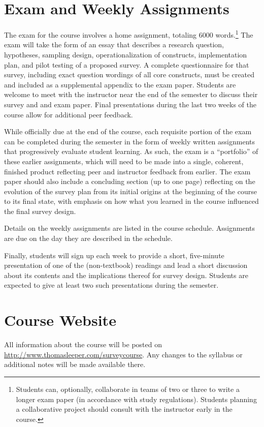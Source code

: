 \documentclass[11pt,a4paper]{article}
\begin{document}
\section{Exam and Weekly Assignments}
The exam for the course involves a home assignment, totaling 6000 words.\footnote{Students can, optionally, collaborate in teams of two or three to write a longer exam paper (in accordance with study regulations). Students planning a collaborative project should consult with the instructor early in the course.} The exam will take the form of an essay that describes a research question, hypotheses, sampling design, operationalization of constructs, implementation plan, and pilot testing of a proposed survey. A complete questionnaire for that survey, including exact question wordings of all core constructs, must be created and included as a supplemental appendix to the exam paper. Students are welcome to meet with the instructor near the end of the semester to discuss their survey and and exam paper. Final presentations during the last two weeks of the course allow for additional peer feedback.

While officially due at the end of the course, each requisite portion of the exam can be completed during the semester in the form of weekly written assignments that progressively evaluate student learning. As such, the exam is a ``portfolio'' of these earlier assignments, which will need to be made into a single, coherent, finished product reflecting peer and instructor feedback from earlier. The exam paper should also include a concluding section (up to one page) reflecting on the evolution of the survey plan from its initial origins at the beginning of the course to its final state, with emphasis on how what you learned in the course influenced the final survey design.

Details on the weekly assignments are listed in the course schedule. Assignments are due on the day they are described in the schedule.

Finally, students will sign up each week to provide a short, five-minute presentation of one of the (non-textbook) readings and lead a short discussion about its contents and the implications thereof for survey design. Students are expected to give at least two such presentations during the semester.

\section{Course Website}
All information about the course will be posted on \url{http://www.thomasleeper.com/surveycourse}. Any changes to the syllabus or additional notes will be made available there.
\end{document}

